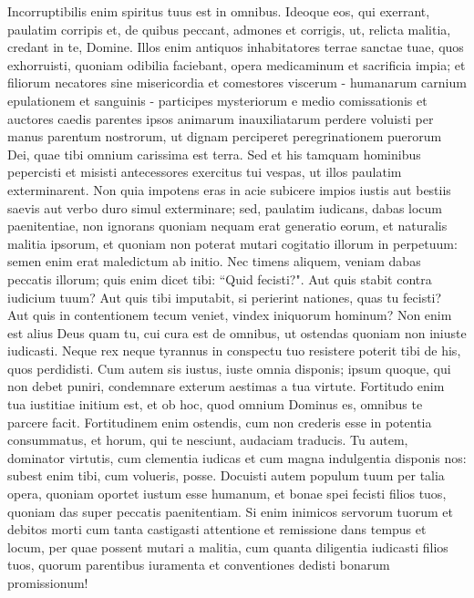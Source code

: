 \begin{biblechapter}  
\verse Incorruptibilis enim spiritus tuus est in omnibus. 
\verse Ideoque eos, qui exerrant, paulatim corripis et, de quibus peccant, admones et corrigis, ut, relicta malitia, credant in te, Domine. 
\verse Illos enim antiquos inhabitatores terrae sanctae tuae, quos exhorruisti, 
\verse quoniam odibilia faciebant, opera medicaminum et sacrificia impia; 
\verse et filiorum necatores sine misericordia et comestores viscerum - humanarum carnium epulationem et sanguinis - participes mysteriorum e medio comissationis 
\verse et auctores caedis parentes ipsos animarum inauxiliatarum perdere voluisti per manus parentum nostrorum, 
\verse ut dignam perciperet peregrinationem puerorum Dei, quae tibi omnium carissima est terra. 
\verse Sed et his tamquam hominibus pepercisti et misisti antecessores exercitus tui vespas, ut illos paulatim exterminarent. 
\verse Non quia impotens eras in acie subicere impios iustis aut bestiis saevis aut verbo duro simul exterminare; 
\verse sed, paulatim iudicans, dabas locum paenitentiae, non ignorans quoniam nequam erat generatio eorum, et naturalis malitia ipsorum, et quoniam non poterat mutari cogitatio illorum in perpetuum: 
\verse semen enim erat maledictum ab initio. Nec timens aliquem, veniam dabas peccatis illorum; 
\verse quis enim dicet tibi: “Quid fecisti?". Aut quis stabit contra iudicium tuum? Aut quis tibi imputabit, si perierint nationes, quas tu fecisti? Aut quis in contentionem tecum veniet, vindex iniquorum hominum? 
\verse Non enim est alius Deus quam tu, cui cura est de omnibus, ut ostendas quoniam non iniuste iudicasti. 
\verse Neque rex neque tyrannus in conspectu tuo resistere poterit tibi de his, quos perdidisti. 
\verse Cum autem sis iustus, iuste omnia disponis; ipsum quoque, qui non debet puniri, condemnare exterum aestimas a tua virtute. 
\verse Fortitudo enim tua iustitiae initium est, et ob hoc, quod omnium Dominus es, omnibus te parcere facit. 
\verse Fortitudinem enim ostendis, cum non crederis esse in potentia consummatus, et horum, qui te nesciunt, audaciam traducis. 
\verse Tu autem, dominator virtutis, cum clementia iudicas et cum magna indulgentia disponis nos: subest enim tibi, cum volueris, posse. 
\verse Docuisti autem populum tuum per talia opera, quoniam oportet iustum esse humanum, et bonae spei fecisti filios tuos, quoniam das super peccatis paenitentiam. 
\verse Si enim inimicos servorum tuorum et debitos morti cum tanta castigasti attentione et remissione dans tempus et locum, per quae possent mutari a malitia, 
\verse cum quanta diligentia iudicasti filios tuos, quorum parentibus iuramenta et conventiones dedisti bonarum promissionum! 

\end{biblechapter}
